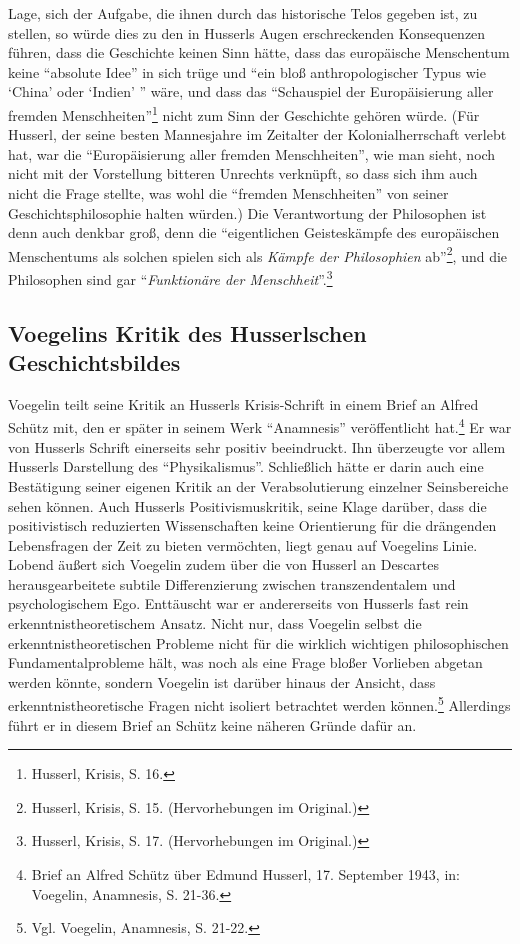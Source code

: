 Lage, sich der Aufgabe, die ihnen durch das historische Telos gegeben ist, zu
stellen, so würde dies zu den in Husserls Augen erschreckenden Konsequenzen
führen, dass die Geschichte keinen Sinn hätte, dass das europäische
Menschentum keine "`absolute Idee"' in sich trüge und "`ein bloß
anthropologischer Typus wie `China' oder `Indien' "' wäre, und dass das
"`Schauspiel der Europäisierung aller fremden Menschheiten"'\footnote{Husserl,
  Krisis, S. 16.} nicht zum Sinn der Geschichte gehören würde. (Für Husserl,
der seine besten Mannesjahre im Zeitalter der Kolonialherrschaft verlebt hat,
war die "`Europäisierung aller fremden Menschheiten"', wie man sieht, noch
nicht mit der Vorstellung bitteren Unrechts verknüpft, so dass sich ihm auch
nicht die Frage stellte, was wohl die "`fremden Menschheiten"' von seiner
Geschichtsphilosophie halten würden.)  Die Verantwortung der Philosophen ist
denn auch denkbar groß, denn die "`eigentlichen Geisteskämpfe des europäischen
Menschentums als solchen spielen sich als {\it Kämpfe der Philosophien}
ab"'\footnote{Husserl, Krisis, S. 15.  (Hervorhebungen im Original.)}, und die
Philosophen sind gar "`{\it Funktionäre der Menschheit}"'.\footnote{Husserl,
  Krisis, S. 17.  (Hervorhebungen im Original.)}

\subsection{Voegelins Kritik des Husserlschen Geschichtsbildes}

Voegelin teilt seine Kritik an Husserls Krisis-Schrift in einem Brief an
Alfred Schütz mit, den er später in seinem Werk "`Anamnesis"' veröffentlicht
hat.\footnote{Brief an Alfred Schütz über Edmund Husserl, 17.  September 1943,
  in: Voegelin, Anamnesis, S. 21-36.} Er war von Husserls Schrift
einerseits sehr positiv beeindruckt. Ihn überzeugte vor allem Husserls
Darstellung des "`Physikalismus"'. Schließlich hätte er darin auch eine
Bestätigung seiner eigenen Kritik an der Verabsolutierung einzelner
Seinsbereiche sehen können. Auch Husserls Positivismuskritik, seine Klage
darüber, dass die positivistisch reduzierten Wissenschaften keine Orientierung
für die drängenden Lebensfragen der Zeit zu bieten vermöchten, liegt genau auf
Voegelins Linie. Lobend äußert sich Voegelin zudem über die von Husserl an
Descartes herausgearbeitete subtile Differenzierung zwischen transzendentalem
und psychologischem Ego. Enttäuscht war er andererseits von Husserls
fast rein erkenntnistheoretischem Ansatz. Nicht nur, dass Voegelin selbst die
erkenntnistheoretischen Probleme nicht für die wirklich wichtigen
philosophischen Fundamentalprobleme hält, was noch als eine Frage bloßer
Vorlieben abgetan werden könnte, sondern Voegelin ist darüber hinaus der
Ansicht, dass erkenntnistheoretische Fragen nicht isoliert betrachtet werden
können.\footnote{Vgl. Voegelin, Anamnesis, S. 21-22.} Allerdings führt er in
diesem Brief an Schütz keine näheren Gründe dafür an.
 
